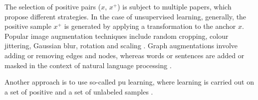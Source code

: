 The selection of positive pairs ($x$, $x^+$) is subject to multiple papers, 
which propose different strategies.
In the case of unsupervised learning, generally, 
the positive sample $x^+$ is generated by applying a transformation to the anchor $x$.
Popular image augmentation techniques include random cropping, colour jittering, Gaussian blur,
rotation and scaling \citet{adversarial_2020,robinson_contrastive_2021,curricular_weighting_2024}.
Graph augmentations involve adding or removing edges and nodes, 
whereas words or sentences are added or masked in the context of natural language processing 
\citet{curricular_weighting_2024}.

Another approach is to use so-called \ac{pu} learning, where learning is carried out 
on a set of positive and a set of unlabeled samples \citet{chuang_debiased_2020}.
